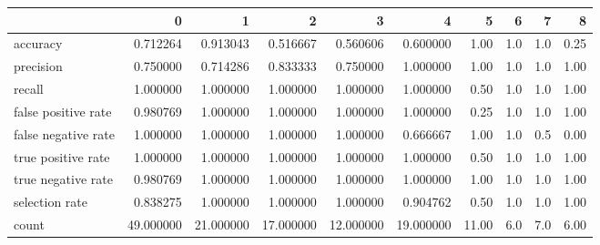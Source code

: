 \begin{tabular}{lrrrrrrrrr}
\toprule
{} &          0 &          1 &          2 &          3 &          4 &      5 &    6 &    7 &     8 \\
\midrule
accuracy            &   0.712264 &   0.913043 &   0.516667 &   0.560606 &   0.600000 &   1.00 &  1.0 &  1.0 &  0.25 \\
precision           &   0.750000 &   0.714286 &   0.833333 &   0.750000 &   1.000000 &   1.00 &  1.0 &  1.0 &  1.00 \\
recall              &   1.000000 &   1.000000 &   1.000000 &   1.000000 &   1.000000 &   0.50 &  1.0 &  1.0 &  1.00 \\
false positive rate &   0.980769 &   1.000000 &   1.000000 &   1.000000 &   1.000000 &   0.25 &  1.0 &  1.0 &  1.00 \\
false negative rate &   1.000000 &   1.000000 &   1.000000 &   1.000000 &   0.666667 &   1.00 &  1.0 &  0.5 &  0.00 \\
true positive rate  &   1.000000 &   1.000000 &   1.000000 &   1.000000 &   1.000000 &   0.50 &  1.0 &  1.0 &  1.00 \\
true negative rate  &   0.980769 &   1.000000 &   1.000000 &   1.000000 &   1.000000 &   1.00 &  1.0 &  1.0 &  1.00 \\
selection rate      &   0.838275 &   1.000000 &   1.000000 &   1.000000 &   0.904762 &   0.50 &  1.0 &  1.0 &  1.00 \\
count               &  49.000000 &  21.000000 &  17.000000 &  12.000000 &  19.000000 &  11.00 &  6.0 &  7.0 &  6.00 \\
\bottomrule
\end{tabular}
